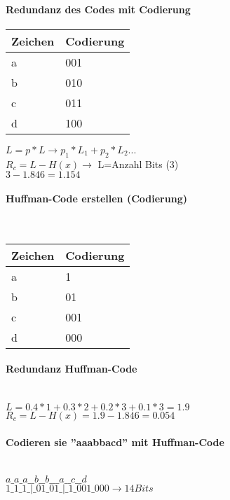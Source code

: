 \paragraph{Redundanz des Codes mit Codierung}
\begin{center}
    \centering
    \begin{tabular}{l | l}
        \bfseries{Zeichen} & \bfseries{Codierung}\\ \hline
        a & 001\\ 
        b & 010\\
        c & 011\\
        d & 100\\
    \end{tabular}
\end{center}
$L = p*L \rightarrow p_1*L_1+p_2*L_2...$\\
$R_c = L - H(x) \rightarrow$ L=Anzahl Bits (3)\\
$3-1.846=1.154$

\paragraph{Huffman-Code erstellen (Codierung)}\mbox{}\\
\begin{center}
    \centering
    \begin{tabular}{l | l}
        \bfseries{Zeichen} & \bfseries{Codierung}\\ \hline
        a & 1\\ 
        b & 01\\
        c & 001\\
        d & 000\\
    \end{tabular}
\end{center}

\paragraph{Redundanz Huffman-Code}\mbox{}\\
$L=0.4*1+0.3*2+0.2*3+0.1*3=1.9$\\
$R_c = L-H(x) = 1.9-1.846=0.054$

\paragraph{Codieren sie ''aaabbacd'' mit Huffman-Code}\mbox{}\\
$a\_a\_a\_\_b\_\_b\_\_\_a\_\_c\_\_d$\\
$1\_1\_1\_|\_01\_01\_|\_1\_001\_000 \rightarrow 14 Bits$

